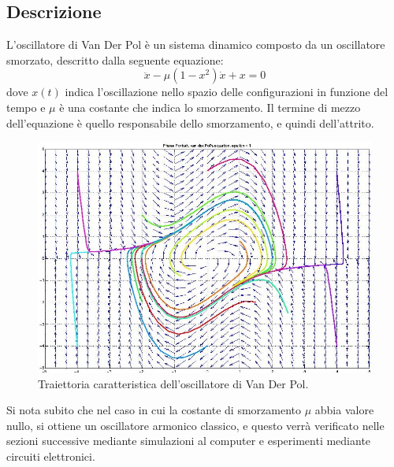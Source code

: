 \documentclass[12pt]{article}
\begin{document}
\subsection{Descrizione}
L'oscillatore di Van Der Pol è un sistema dinamico composto da un oscillatore smorzato, descritto dalla seguente equazione:
\begin{equation}
	\ddot{x} - \mu(1-x^2)\dot{x} + x = 0
\end{equation}
dove $x(t)$ indica l'oscillazione nello spazio delle configurazioni in funzione del tempo e $\mu$ è una costante che indica lo smorzamento. Il termine di mezzo dell'equazione è quello responsabile dello smorzamento, e quindi dell'attrito. 
\begin{figure}[H]
	\centering
	\includegraphics[scale=.4]{Spazio delle fasi oscillatore} 
	\caption{Traiettoria caratteristica dell'oscillatore di Van Der Pol.}
\end{figure}
Si nota subito che nel caso in cui la costante di smorzamento $\mu$ abbia valore nullo, si ottiene un oscillatore armonico classico, e questo verrà verificato nelle sezioni successive mediante simulazioni al computer e esperimenti mediante circuiti elettronici. 
\end{document}
